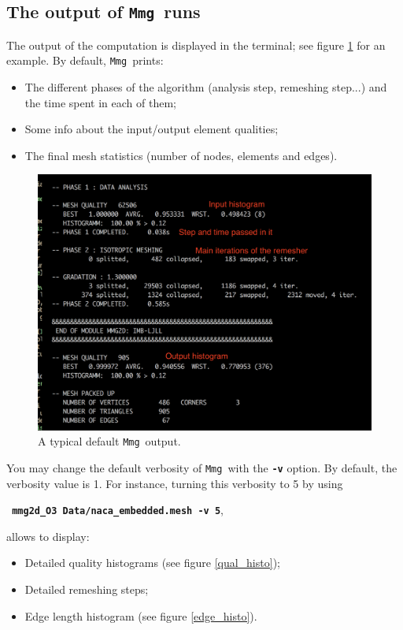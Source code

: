 \documentclass{article}
\newcommand{\ttb}[1]{\texttt{\textbf{#1}}}
\newcommand{\mmg}{\texttt{Mmg}}
\begin{document}
\subsection{The output of \mmg\ runs}
The output of the computation is displayed in the terminal; see figure \ref{mmg_konsole} for an example. 
By default, \mmg\ prints:
\begin{itemize}
\item The different phases of the algorithm (analysis step, remeshing
  step...) and the time spent in each of them;
\item Some info about the input/output element qualities;
\item The final mesh statistics (number of nodes, elements and edges).
\end{itemize}
\begin{figure}
\centering
\includegraphics[width=0.8\linewidth]{mmg_konsole}
\caption{\label{mmg_konsole}
A typical default \mmg\ output.}
\end{figure}

You may change the default verbosity of \mmg\ with the \ttb{-v}
option. By default, the verbosity value is 1. For instance, turning this verbosity to 5 by using 
\begin{center}
\ttb{ mmg2d\_O3 Data/naca\_embedded.mesh -v 5},
\end{center} 
allows to display:
\begin{itemize}
\item Detailed quality histograms (see figure \ref{qual_histo});
\item Detailed remeshing steps;
\item Edge length histogram (see figure \ref{edge_histo}).
\end{itemize}
\end{document}

